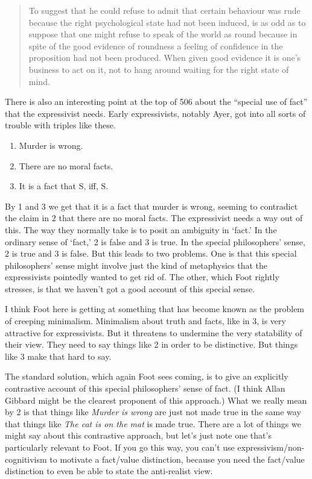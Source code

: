 \documentclass[
]{article}
\providecommand{\tightlist}{%
  \setlength{\itemsep}{0pt}\setlength{\parskip}{0pt}}
\begin{document}
\begin{quote}
To suggest that he could refuse to admit that certain behaviour was rude
because the right psychological state had not been induced, is as odd as
to suppose that one might refuse to speak of the world as round because
in spite of the good evidence of roundness a feeling of confidence in
the proposition had not been produced. When given good evidence it is
one's business to act on it, not to hang around waiting for the right
state of mind.
\end{quote}

There is also an interesting point at the top of 506 about the ``special
use of fact'' that the expressivist needs. Early expressivists, notably
Ayer, got into all sorts of trouble with triples like these.

\begin{enumerate}
\def\labelenumi{\arabic{enumi}.}
\tightlist
\item
  Murder is wrong.
\item
  There are no moral facts.
\item
  It is a fact that S, iff, S.
\end{enumerate}

By 1 and 3 we get that it is a fact that murder is wrong, seeming to
contradict the claim in 2 that there are no moral facts. The
expressivist needs a way out of this. The way they normally take is to
posit an ambiguity in `fact.' In the ordinary sense of `fact,' 2 is
false and 3 is true. In the special philosophers' sense, 2 is true and 3
is false. But this leads to two problems. One is that this special
philosophers' sense might involve just the kind of metaphysics that the
expressivists pointedly wanted to get rid of. The other, which Foot
rightly stresses, is that we haven't got a good account of this special
sense.

I think Foot here is getting at something that has become known as the
problem of creeping minimalism. Minimalism about truth and facts, like
in 3, is very attractive for expressivists. But it threatens to
undermine the very statability of their view. They need to say things
like 2 in order to be distinctive. But things like 3 make that hard to
say.

The standard solution, which again Foot sees coming, is to give an
explicitly contrastive account of this special philosophers' sense of
fact. (I think Allan Gibbard might be the clearest proponent of this
approach.) What we really mean by 2 is that things like \emph{Murder is
wrong} are just not made true in the same way that things like \emph{The
cat is on the mat} is made true. There are a lot of things we might say
about this contrastive approach, but let's just note one that's
particularly relevant to Foot. If you go this way, you can't use
expressivism/non-cognitivism to motivate a fact/value distinction,
because you need the fact/value distinction to even be able to state the
anti-realist view.
\end{document}
